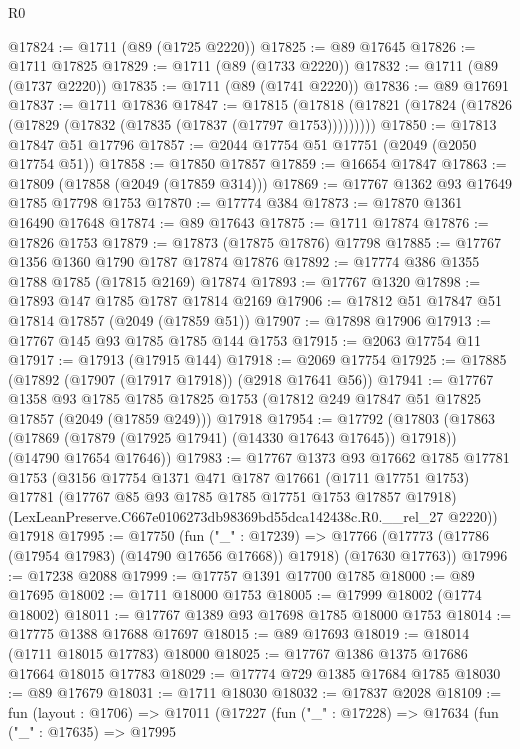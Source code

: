 \begin{lexlean}{R0}
\begin{coremodule}
@17824 := @1711 (@89 (@1725 @2220))
@17825 := @89 @17645
@17826 := @1711 @17825
@17829 := @1711 (@89 (@1733 @2220))
@17832 := @1711 (@89 (@1737 @2220))
@17835 := @1711 (@89 (@1741 @2220))
@17836 := @89 @17691
@17837 := @1711 @17836
@17847 := @17815
    (@17818 (@17821 (@17824 (@17826 (@17829 (@17832 (@17835 (@17837 (@17797 @1753)))))))))
@17850 := @17813 @17847 @51 @17796
@17857 := @2044 @17754 @51 @17751 (@2049 (@2050 @17754 @51))
@17858 := @17850 @17857
@17859 := @16654 @17847
@17863 := @17809 (@17858 (@2049 (@17859 @314)))
@17869 := @17767 @1362 @93 @17649 @1785 @17798 @1753
@17870 := @17774 @384
@17873 := @17870 @1361 @16490 @17648
@17874 := @89 @17643
@17875 := @1711 @17874
@17876 := @17826 @1753
@17879 := @17873 (@17875 @17876) @17798
@17885 := @17767 @1356 @1360 @1790 @1787 @17874 @17876
@17892 := @17774 @386 @1355 @1788 @1785 (@17815 @2169) @17874
@17893 := @17767 @1320
@17898 := @17893 @147 @1785 @1787 @17814 @2169
@17906 := @17812 @51 @17847 @51 @17814 @17857 (@2049 (@17859 @51))
@17907 := @17898 @17906
@17913 := @17767 @145 @93 @1785 @1785 @144 @1753
@17915 := @2063 @17754 @11
@17917 := @17913 (@17915 @144)
@17918 := @2069 @17754
@17925 := @17885 (@17892 (@17907 (@17917 @17918)) (@2918 @17641 @56))
@17941 := @17767
    @1358
    @93
    @1785
    @1785
    @17825
    @1753
    (@17812 @249 @17847 @51 @17825 @17857 (@2049 (@17859 @249)))
    @17918
@17954 := @17792
    (@17803
      (@17863 (@17869 (@17879 (@17925 @17941) (@14330 @17643 @17645)) @17918))
      (@14790 @17654 @17646))
@17983 := @17767
    @1373
    @93
    @17662
    @1785
    @17781
    @1753
    (@3156
      @17754
      @1371
      @471
      @1787
      @17661
      (@1711 @17751 @1753)
      @17781
      (@17767 @85 @93 @1785 @1785 @17751 @1753 @17857 @17918)
      (LexLeanPreserve.C667e0106273db98369bd55dca142438c.R0.__rel_27 @2220))
    @17918
@17995 := @17750
    (fun ("_" : @17239) =>
    @17766 (@17773 (@17786 (@17954 @17983) (@14790 @17656 @17668)) @17918) (@17630 @17763))
@17996 := @17238 @2088
@17999 := @17757 @1391 @17700 @1785
@18000 := @89 @17695
@18002 := @1711 @18000 @1753
@18005 := @17999 @18002 (@1774 @18002)
@18011 := @17767 @1389 @93 @17698 @1785 @18000 @1753
@18014 := @17775 @1388 @17688 @17697
@18015 := @89 @17693
@18019 := @18014 (@1711 @18015 @17783) @18000
@18025 := @17767 @1386 @1375 @17686 @17664 @18015 @17783
@18029 := @17774 @729 @1385 @17684 @1785
@18030 := @89 @17679
@18031 := @1711 @18030
@18032 := @17837 @2028
@18109 := fun (layout : @1706) =>
  @17011
    (@17227
      (fun ("_" : @17228) =>
      @17634
        (fun ("_" : @17635) =>
        @17995

\end{coremodule}
\end{lexlean}
